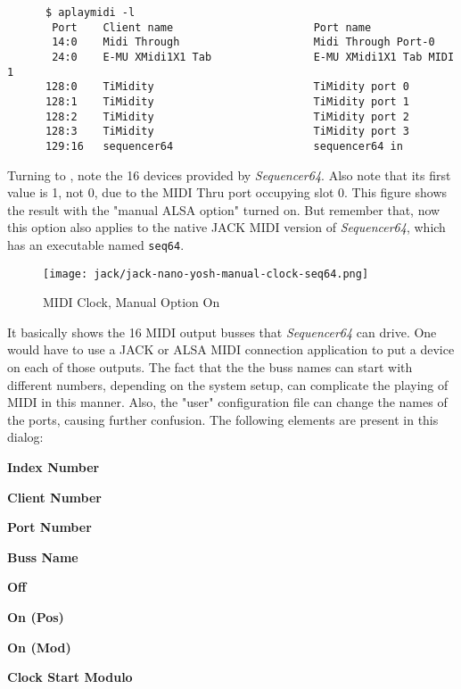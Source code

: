    \begin{verbatim}
      $ aplaymidi -l
       Port    Client name                      Port name
       14:0    Midi Through                     Midi Through Port-0
       24:0    E-MU XMidi1X1 Tab                E-MU XMidi1X1 Tab MIDI 1
      128:0    TiMidity                         TiMidity port 0
      128:1    TiMidity                         TiMidity port 1
      128:2    TiMidity                         TiMidity port 2
      128:3    TiMidity                         TiMidity port 3
      129:16   sequencer64                      sequencer64 in
   \end{verbatim}


   Turning to ,
   note the 16 devices provided by
   \textsl{Sequencer64}.  Also note that its first value is 1, not 0, due to
   the MIDI Thru port occupying slot 0.
   This figure shows the result with the "manual ALSA option" turned on.
   But remember that, now this option also applies to the native JACK MIDI
   version of \textsl{Sequencer64}, which has an executable named
   \texttt{seq64}.

\begin{figure}[H]
   \centering 
   \texttt{[image: jack/jack-nano-yosh-manual-clock-seq64.png]}
   \caption{MIDI Clock, Manual Option On}
   \label{fig:seq64_midi_clock_4_devices_manual_1}
\end{figure}

   It basically shows the 16 MIDI output busses that \textsl{Sequencer64} can
   drive.  One would have to use a JACK or ALSA MIDI connection application to
   put a device on each of those outputs.  The fact that the the buss names can
   start with different numbers, depending on the system setup, can complicate
   the playing of MIDI in this manner.  Also, the "user" configuration file can
   change the names of the ports, causing further confusion.
   The following elements are present in this dialog:

   \begin{enumber}
      \item \textbf{Index Number}
      \item \textbf{Client Number}
      \item \textbf{Port Number}
      \item \textbf{Buss Name}
      \item \textbf{Off}
      \item \textbf{On (Pos)}
      \item \textbf{On (Mod)}
      \item \textbf{Clock Start Modulo}
   \end{enumber}

